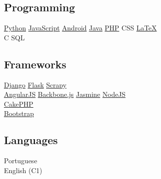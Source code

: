 \documentclass[]{joaosoares-resume}
\begin{document}
\begin{minipage}[t]{0.35\textwidth}
\subsection{Programming}
\href{http://www.python.org}{Python} \textbullet{}
\href{http://www.php.net}{JavaScript} \textbullet{}
\href{http://android.com}{Android} \textbullet{}
\href{https://www.oracle.com/java/}{Java} \textbullet{}
\href{http://www.php.net}{PHP} \textbullet{}
CSS \textbullet{}
\href{http://www.latex-project.org}{\LaTeX} \\
C \textbullet{}
SQL \\
\sectionsep

\subsection{Frameworks}
\href{https://www.djangoproject.com/}{Django} \textbullet{}
\href{http://flask.pocoo.org/}{Flask} \textbullet{}
\href{https://scrapy.org/}{Scrapy} \\
\href{https://angularjs.org/}{AngularJS} \textbullet
\href{http://backbonejs.org/}{Backbone.js} \textbullet
\href{https://jasmine.github.io/}{Jasmine} \textbullet
\href{https://nodejs.org/en/}{NodeJS} \\
\href{https://cakephp.org/}{CakePHP} \\
\href{http://getbootstrap.com/}{Bootstrap} \\
\sectionsep

\subsection{Languages}
Portuguese \\
English (C1) \\


\end{minipage} 
\hfill
\end{document}
